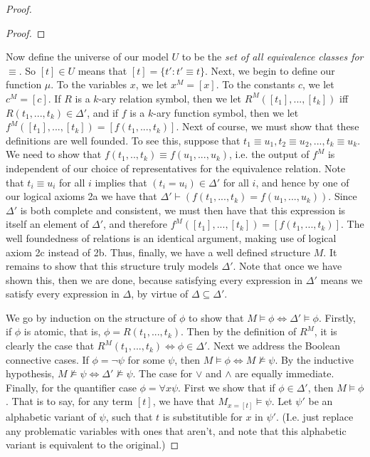 \documentclass{article}
\theoremstyle{definition}
\theoremstyle{plain}
\theoremstyle{theorem}
\begin{document}
\begin{proof}
\begin{proof}
    \end{proof}
    Now define the universe of our model $U$ to be the \textit{set of all equivalence classes for $\equiv$}. So $[t] \in U$ means that $[t] = \{t': t' \equiv t\}$. Next, we begin to define our function $\mu$. To the variables $x$, we let $x^M = [x]$. To the constants $c$, we let $c^M = [c]$. If $R$ is a $k$-ary relation symbol, then we let $R^M([t_1],...,[t_k])$ iff $R(t_1,...,t_k) \in \Delta'$, and if $f$ is a $k$-ary function symbol, then we let $f^M([t_1],...,[t_k]) = [f(t_1,...,t_k)]$. Next of course, we must show that these definitions are well founded. To see this, suppose that $t_1 \equiv u_1, t_2 \equiv u_2,..., t_k \equiv u_k$. We need to show that $f(t_1,..,t_k) \equiv f(u_1,...,u_k)$, i.e. the output of $f^M$ is independent of our choice of representatives for the equivalence relation. Note that $t_i \equiv u_i$ for all $i$ implies that $(t_i = u_i) \in \Delta'$ for all $i$, and hence by one of our logical axioms 2a we have that $\Delta' \vdash (f(t_1,...,t_k) = f(u_1,...,u_k))$. Since $\Delta'$ is both complete and consistent, we must then have that this expression is itself an element of $\Delta'$, and therefore $f^M([t_1],...,[t_k]) = [f(t_1,...,t_k)]$. The well foundedness of relations is an identical argument, making use of logical axiom 2c instead of 2b. Thus, finally, we have a well defined structure $M$. It remains to show that this structure truly models $\Delta'$. Note that once we have shown this, then we are done, because satisfying every expression in $\Delta'$ means we satisfy every expression in $\Delta$, by virtue of $\Delta \subseteq \Delta'$.
    \par We go by induction on the structure of $\phi$ to show that $M \models \phi \iff \Delta' \models \phi$. Firstly, if $\phi$ is atomic, that is, $\phi = R(t_1,...,t_k)$. Then by the definition of $R^M$, it is clearly the case that $R^M(t_1,...,t_k) \iff \phi \in \Delta'$. Next we address the Boolean connective cases. 
    If $\phi = \neg \psi$ for some $\psi$, then $M \models \phi \iff M \nvDash \psi$. By the inductive hypothesis, $M \nvDash \psi \iff \Delta' \nvDash \psi$. The case for $\vee$ and $\wedge$ are equally immediate. Finally, for the quantifier case $\phi = \forall x \psi$. First we show that if $\phi \in \Delta'$, then $M \models \phi$. 
    That is to say, for any term $[t]$, we have that $M_{x = [t]} \models \psi$. Let $\psi'$ be an alphabetic variant of $\psi$, such that $t$ is substitutible for $x$ in $\psi'$. (I.e. just replace any problematic variables with ones that aren't, and note that this alphabetic variant is equivalent to the original.) 

\end{proof}
\end{document}
